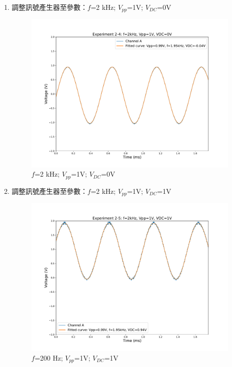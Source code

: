 \documentclass[12pt,a4paper]{article}
\begin{document}
\begin{CJK}{UTF8}{bkai}
\begin{enumerate}
    \item 調整訊號產生器至參數：$f$=2 kHz; $V_{pp}$=1V; $V_{DC}$=0V
    \begin{figure}[h]
        \centering
        \vspace{-0.8cm}
        \includegraphics[width=0.75\linewidth]{figures/exp2/exp2-4.pdf}
        \vspace{-0.5cm}
        \caption{$f$=2 kHz; $V_{pp}$=1V; $V_{DC}$=0V}
        \label{fig:exp2_4}
    \end{figure}
    
    \item 調整訊號產生器至參數：$f$=2 kHz; $V_{pp}$=1V; $V_{DC}$=1V
    \begin{figure}[h]
        \centering
        \vspace{-0.8cm}
        \includegraphics[width=0.75\linewidth]{figures/exp2/exp2-5.pdf}
        \vspace{-0.5cm}
        \caption{$f$=200 Hz; $V_{pp}$=1V; $V_{DC}$=1V}
        \label{fig:exp2_5}
    \end{figure}
    \clearpage
\end{enumerate}


\end{CJK}
\end{document}
